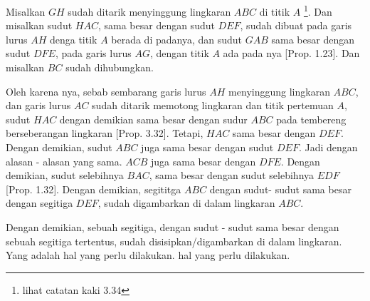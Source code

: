 \documentclass[a4paper]{book}
\begin{document}
Misalkan $GH$ sudah ditarik menyinggung lingkaran $ABC$ di titik $A$ 
\footnote{lihat catatan kaki 3.34}. Dan misalkan sudut $HAC$, sama besar
dengan sudut $DEF$, sudah dibuat pada garis lurus $AH$ denga titik $A$ berada
di padanya, dan sudut $GAB$ sama besar dengan sudut  $DFE$, pada garis lurus
$AG$, dengan titik $A$ ada pada nya [Prop. 1.23]. Dan misalkan $BC$ sudah 
dihubungkan.

Oleh karena nya, sebab sembarang garis lurus $AH$ menyinggung lingkaran 
$ABC$, dan garis lurus $AC$ sudah ditarik memotong lingkaran dan titik 
pertemuan $A$, sudut $HAC$ dengan demikian sama besar dengan sudur $ABC$
pada tembereng berseberangan lingkaran [Prop. 3.32]. Tetapi, $HAC$ sama
besar dengan $DEF$. Dengan demikian, sudut $ABC$ juga sama besar dengan sudut
$DEF$. Jadi dengan alasan - alasan yang sama. $ACB$ juga sama besar dengan 
$DFE$. Dengan demikian, sudut selebihnya $BAC$, sama besar dengan sudut 
selebihnya $EDF$ [Prop. 1.32]. Dengan demikian, segititga $ABC$ dengan sudut- sudut sama besar dengan segitiga $DEF$, sudah digambarkan di dalam lingkaran
$ABC$.

Dengan demikian, sebuah segitiga, dengan sudut - sudut sama besar dengan 
sebuah segitiga tertentus, sudah disisipkan/digambarkan di dalam lingkaran. Yang adalah hal yang perlu dilakukan.
hal yang perlu dilakukan.

\end{document}
